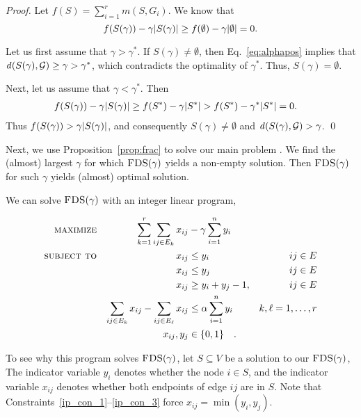 \begin{proof}
Let $f(S) = \sum_{i = 1}^r m(S, G_i)$.
We know that
\begin{equation}
\label{eq:alphapos}
    f(S(\gamma)) - \gamma {\left|S(\gamma)\right|} \geq f(\emptyset) - \gamma{\left|\emptyset\right|} = 0.
\end{equation}

Let us first assume that $\gamma > \gamma^*$. If $S(\gamma) \neq \emptyset$, then Eq.~\ref{eq:alphapos} implies that $\dens{S(\gamma),  \calG} \geq \gamma > \gamma^*$, which contradicts the optimality of $\gamma^*$. Thus, $S(\gamma) = \emptyset$.

Next, let us assume that $\gamma < \gamma^*$. Then
\[
\begin{split}
    f(S(\gamma)) - \gamma {\left|S(\gamma)\right|} & \geq f(S^*) - \gamma {\left|S^*\right|}  > f(S^*) - \gamma^* {\left|S^*\right|} = 0.
\end{split}
\]
Thus $f(S(\gamma)) >  \gamma {\left|S(\gamma)\right|}$, and consequently $S(\gamma) \neq \emptyset$ and $\dens{S(\gamma), \calG} > \gamma$. \qed
\end{proof}

Next, we use Proposition~\ref{prop:frac} to solve our main problem \problemcdcsm. We find the (almost) largest $\gamma$ for which $\textsc{FDS}(\gamma)$ yields a non-empty solution. Then $\textsc{FDS}(\gamma)$ for such $\gamma$ yields (almost) optimal solution.

We can solve $\textsc{FDS}(\gamma)$ with an integer linear program,

\begin{align}
	\textsc{maximize}&&  \sum_{k = 1}^r \sum_{ ij \in E_k} x_{ij} & - \gamma \sum_{i = 1}^{n} y_i \nonumber \\  
	\textsc{subject to}&& x_{ij} & \leq y_i &  ij \in E  \label{ip_con_1} \\
	&&x_{ij} & \leq y_j &  ij \in E \label{ip_con_2} \\
        &&x_{ij} & \geq y_i  + y_j - 1, &  ij \in E \label{ip_con_3}\\
	&&\sum_{ij \in E_k} x_{ij} - \sum_{ij \in E_\ell} x_{ij}  & \leq \alpha \sum_{i = 1}^{n} y_i   &  k, \ell = 1,\dots, r \label{ip_con_5}\\
	&&x_{ij},  y_j  & \in \{0,1\} \nonumber\quad.
\end{align}

To see why this program solves $\textsc{FDS}(\gamma)$, 
let $S \subseteq V$  be a solution to our $\textsc{FDS}(\gamma)$, 
The indicator variable $y_i$ denotes whether the node $i \in S$, and the indicator variable $x_{ij}$ denotes whether both endpoints of edge $ij$ are in $S$.
Note that Constraints~\ref{ip_con_1}--\ref{ip_con_3} force $x_{ij} = \min(y_i, y_j)$.

